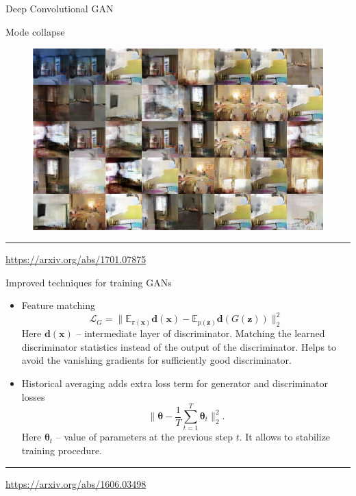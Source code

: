 \documentclass{beamer}
\newcommand{\bx}{\mathbf{x}}
\newcommand{\bz}{\mathbf{z}}
\newcommand{\bbE}{\mathbb{E}}
\newcommand{\cL}{\mathcal{L}}
\newcommand{\btheta}{\boldsymbol{\theta}}
\begin{document}
\begin{frame}{Deep Convolutional GAN}
	\begin{block}{Mode collapse}
		\begin{figure}
			\centering
			\includegraphics[width=0.95\linewidth]{figs/mode_collapse_4}
		\end{figure}
	\end{block}
	\vfill
	\hrule\medskip
	{\scriptsize \href{https://arxiv.org/abs/1701.07875}{https://arxiv.org/abs/1701.07875}}
\end{frame}
\begin{frame}{Improved techniques for training GANs}
	\begin{itemize}
		\item Feature matching
		\[
			\cL_G = \| \bbE_{\pi(\bx)} \mathbf{d}(\bx) - \bbE_{p(\bz)} \mathbf{d}(G(\bz)) \|_2^2
		\]
		Here $\mathbf{d}(\bx)$ -- intermediate layer of discriminator. Matching the learned discriminator statistics instead of the output of the discriminator. Helps to avoid the vanishing gradients for sufficiently good discriminator.
		\item Historical averaging adds extra loss term for generator and discriminator losses
		\vspace{-0.2cm}
		\[
		 \| \btheta - \frac{1}{T}\sum_{t=1}^T \btheta_t\|^2_2.
		\]
		Here $\btheta_t$ -- value of parameters at the previous step $t$. It allows to stabilize training procedure.
	\end{itemize}
	\vfill
	\hrule\medskip
	{\scriptsize \href{https://arxiv.org/abs/1606.03498}{https://arxiv.org/abs/1606.03498}}
\end{frame}
\end{document}
